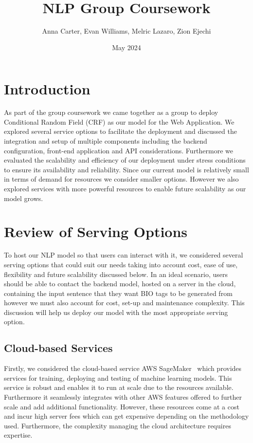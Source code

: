 \documentclass{surreydissertation}
\title{NLP Group Coursework}
\author{Anna Carter, Evan Williams, Melric Lazaro, Zion Ejechi}
\date{May 2024}
\begin{document}
\maketitle

\tableofcontents
\newpage

\section{Introduction}
As part of the group coursework we came together as a group to deploy Conditional Random Field (CRF) as our model for the Web Application. We explored several service options to facilitate the deployment and discussed the integration and setup of multiple components including the backend configuration, front-end application and API considerations. Furthermore we evaluated the scalability and efficiency of our deployment under stress conditions to ensure its availability and reliability. Since our current model is relatively small in terms of demand for resources we consider smaller options. However we also explored services with more powerful resources to enable future scalability as our model grows. 

\section{Review of Serving Options}
To host our NLP model so that users can interact with it, we considered several serving options that could suit our needs taking into account cost, ease of use, flexibility and future scalability discussed below. In an ideal scenario, users should be able to contact the backend model, hosted on a server in the cloud, containing the input sentence that they want BIO tags to be generated from however we must also account for cost, set-up and maintenance complexity. This discussion will help us deploy our model with the most appropriate serving option.


\subsection{Cloud-based Services}
Firstly, we considered the cloud-based service AWS SageMaker~\cite{AWSSageMaker} which provides services for training, deploying and testing of machine learning models. This service is robust and enables it to run at scale due to the resources available. Furthermore it seamlessly integrates with other AWS features offered to further scale and add additional functionality. However, these resources come at a cost and incur high server fees which can get expensive depending on the methodology used. Furthermore, the complexity managing the cloud architecture requires expertise.
\end{document}
